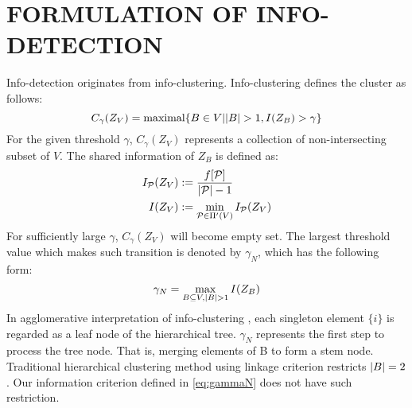 \documentclass[runningheads]{llncs}
\begin{document}
\section{FORMULATION OF INFO-DETECTION}
Info-detection originates from info-clustering. Info-clustering defines the cluster as follows:
\begin{equation}
C_{\gamma}(Z_V) = \textrm{maximal}\{ B \in V \vert \lvert B\rvert > 1, I(Z_B) > \gamma \}
\end{equation}
For the given threshold $\gamma$, $C_{\gamma} (Z_V)$ represents a collection of non-intersecting subset of $V$. The shared information of $Z_B$ is defined as:
\begin{align}
I_{\mathcal{P}}(Z_V) & := \frac{ f[\mathcal{P}] }{  \lvert\mathcal{P}\rvert - 1 }\\
I(Z_V) & := \min_{\mathcal{P} \in \Pi'(V)} I_{\mathcal{P}}(Z_V)  \label{eq:ms}
\end{align}
For sufficiently large $\gamma$, $C_{\gamma} (Z_V)$ will become empty set. The largest threshold value which makes such transition is denoted by $\gamma_N$, which has the following form:
\begin{equation}\label{eq:gammaN}
\gamma_N = \max_{B\subseteq V, \lvert B\rvert>1} I(Z_B)
\end{equation}
In agglomerative interpretation of info-clustering \cite{RN8}, each singleton element $\{i\}$ is regarded as a leaf node of the hierarchical tree. $\gamma_N$ represents the first step to process the tree node. That is, merging elements of B to form a stem node. Traditional hierarchical clustering method using linkage criterion restricts $\lvert B\rvert=2$. Our information criterion defined in \eqref{eq:gammaN} does not have such restriction. 
\end{document}
